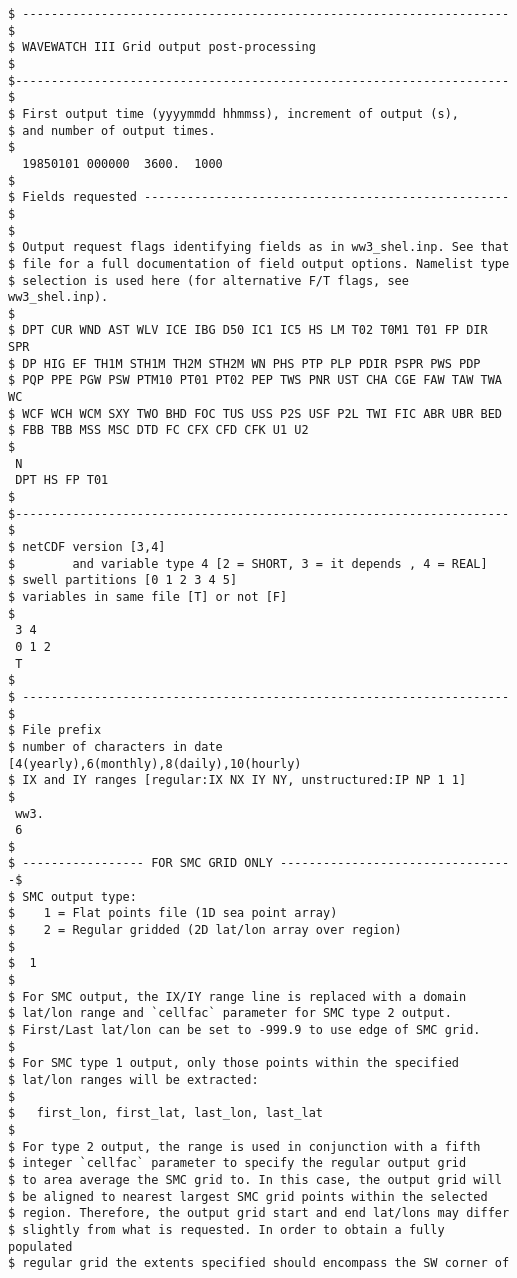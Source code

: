 \begin{footnotesize}
\begin{verbatim}
$ -------------------------------------------------------------------- $
$ WAVEWATCH III Grid output post-processing                            $
$--------------------------------------------------------------------- $
$ First output time (yyyymmdd hhmmss), increment of output (s), 
$ and number of output times.
$
  19850101 000000  3600.  1000
$
$ Fields requested --------------------------------------------------- $
$
$ Output request flags identifying fields as in ww3_shel.inp. See that
$ file for a full documentation of field output options. Namelist type
$ selection is used here (for alternative F/T flags, see ww3_shel.inp).
$
$ DPT CUR WND AST WLV ICE IBG D50 IC1 IC5 HS LM T02 T0M1 T01 FP DIR SPR
$ DP HIG EF TH1M STH1M TH2M STH2M WN PHS PTP PLP PDIR PSPR PWS PDP
$ PQP PPE PGW PSW PTM10 PT01 PT02 PEP TWS PNR UST CHA CGE FAW TAW TWA WC
$ WCF WCH WCM SXY TWO BHD FOC TUS USS P2S USF P2L TWI FIC ABR UBR BED
$ FBB TBB MSS MSC DTD FC CFX CFD CFK U1 U2 
$
 N
 DPT HS FP T01
$
$--------------------------------------------------------------------- $
$ netCDF version [3,4]
$        and variable type 4 [2 = SHORT, 3 = it depends , 4 = REAL]
$ swell partitions [0 1 2 3 4 5]
$ variables in same file [T] or not [F] 
$
 3 4
 0 1 2
 T
$
$ -------------------------------------------------------------------- $
$ File prefix
$ number of characters in date [4(yearly),6(monthly),8(daily),10(hourly)
$ IX and IY ranges [regular:IX NX IY NY, unstructured:IP NP 1 1]
$
 ww3.         
 6
$
$ ----------------- FOR SMC GRID ONLY ---------------------------------$
$ SMC output type:
$    1 = Flat points file (1D sea point array)
$    2 = Regular gridded (2D lat/lon array over region)
$
$  1
$
$ For SMC output, the IX/IY range line is replaced with a domain
$ lat/lon range and `cellfac` parameter for SMC type 2 output.
$ First/Last lat/lon can be set to -999.9 to use edge of SMC grid.
$
$ For SMC type 1 output, only those points within the specified 
$ lat/lon ranges will be extracted:
$
$   first_lon, first_lat, last_lon, last_lat
$
$ For type 2 output, the range is used in conjunction with a fifth
$ integer `cellfac` parameter to specify the regular output grid
$ to area average the SMC grid to. In this case, the output grid will
$ be aligned to nearest largest SMC grid points within the selected 
$ region. Therefore, the output grid start and end lat/lons may differ 
$ slightly from what is requested. In order to obtain a fully populated
$ regular grid the extents specified should encompass the SW corner of

\end{verbatim}
\end{footnotesize}
